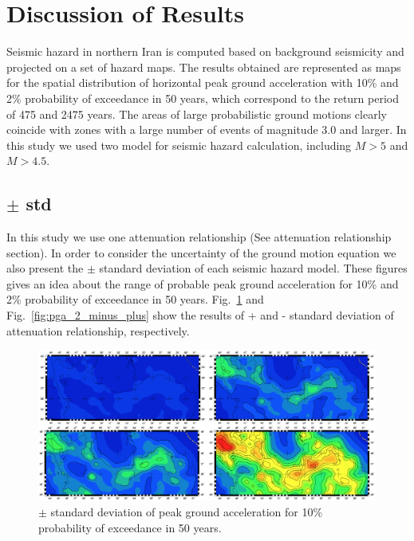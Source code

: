 \newpage
\section{Discussion of Results}
Seismic hazard in northern Iran is computed based on background seismicity and projected on a set of hazard maps. The results obtained are represented as maps for the spatial distribution of horizontal peak ground acceleration with 10\% and 2\% probability of exceedance in 50 years, which correspond to the return period of 475 and 2475 years. The areas of large probabilistic ground motions clearly coincide with zones with a large number of events of magnitude 3.0 and larger. In this study we used two model for seismic hazard calculation, including $M>5$ and $M>4.5$.

\subsection{$\pm$ std}
In this study we use one attenuation relationship (See attenuation relationship section). In order to consider the uncertainty of the ground motion equation we also present the $\pm$ standard deviation of each seismic hazard model. These figures gives an idea about the range of probable peak ground acceleration for 10\% and 2\% probability of exceedance in 50 years. Fig.~\ref{fig:pga_10_minus_plus} and Fig.~\ref{fig:pga_2_minus_plus} show the results of + and - standard deviation of attenuation relationship, respectively.


\begin{figure} [!ht]
\centering
\includegraphics[scale=0.15]{figures/pdf/pga_10_minus_plus.pdf} 
\caption{$\pm$ standard deviation of peak ground acceleration for 10\% probability of exceedance in 50 years.}
\label{fig:pga_10_minus_plus}
\end{figure}



